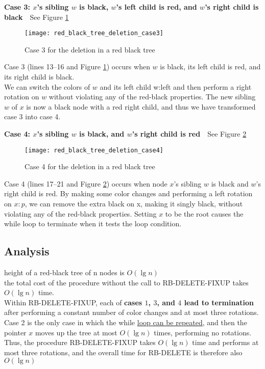\documentclass{article}
\begin{document}
\textbf{Case 3: $x$'s sibling $w$ is black, $w$'s left child is red, and $w$'s right child is black}\ \ See Figure \ref{fig.rbt.deletion.case3}\\
\begin{figure}[htbp]
  \centering
  \texttt{[image: red\_black\_tree\_deletion\_case3]}\\
  \caption{Case 3 for the deletion in a red black tree}\label{fig.rbt.deletion.case3}
\end{figure}
Case 3 (lines 13–16 and Figure \ref{fig.rbt.deletion.case3}) occurs when $w$ is black, its left child is red, and its right child is black. \\
We can switch the colors of $w$ and its left child w:left and then perform a right rotation on $w$ without violating any of the red-black properties. The new sibling $w$ of $x$ is now a black node with a red right child, and thus we have transformed case 3 into case 4.

\textbf{Case 4: $x$'s sibling $w$ is black, and $w$'s right child is red}\ \ See Figure \ref{fig.rbt.deletion.case4}\\
\begin{figure}[htbp]
  \centering
  \texttt{[image: red\_black\_tree\_deletion\_case4]}\\
  \caption{Case 4 for the deletion in a red black tree}\label{fig.rbt.deletion.case4}
\end{figure}
Case 4 (lines 17–21 and Figure \ref{fig.rbt.deletion.case4}) occurs when node $x$'s sibling $w$ is black and $w$'s right child is red. By making some color changes and performing a left rotation on $x:p$, we can remove the extra black on x, making it singly black, without violating any of the red-black properties. Setting $x$ to be the root causes the while loop to terminate when it tests the loop condition.

\subsection{Analysis}
height of a red-black tree of n nodes is $O(\lg n)$\\
the total cost of the procedure without the call to RB-DELETE-FIXUP takes $O(\lg n)$ time.\\
Within RB-DELETE-FIXUP, each of \textbf{cases $1$, $3$, and $4$ lead to termination} after performing a constant number of color changes and at most three rotations.\\
Case 2 is the only case in which the while \underline{loop can be repeated}, and then the pointer $x$ moves up the tree at most $O(\lg n)$ times, performing no rotations. Thus, the procedure RB-DELETE-FIXUP takes $O(\lg n)$ time and performs at most three rotations, and the overall time for RB-DELETE is therefore also $O(\lg n)$
\end{document}
